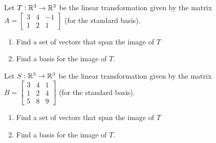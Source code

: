 \begin{applicationActivities}{2}{18}
\begin{activity}{0}
Let $T: \mathbb{R}^3 \rightarrow \mathbb{R}^3$ be the linear transformation given by the matrix $A=\begin{bmatrix} 3 & 4 & -1 \\ 1 & 2 & 1 \end{bmatrix}$ (for the standard basis).
\begin{enumerate}[1)]
\item Find a set of vectors that span the image of $T$
\item Find a basis for the image of $T$.
\end{enumerate}
\end{activity}

\begin{activity}{0}
Let $S: \mathbb{R}^3 \rightarrow \mathbb{R}^3$ be the linear transformation given by the matrix $B=\begin{bmatrix} 3 & 4 & 1 \\ 1 & 2 & 4 \\ 5 & 8 & 9  \end{bmatrix}$ (for the standard basis).
\begin{enumerate}[1)]
\item Find a set of vectors that span the image of $T$
\item Find a basis for the image of $T$.
\end{enumerate}
\end{activity}

\end{applicationActivities}
